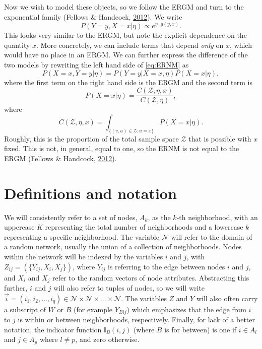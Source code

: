 \documentclass[12pt,twoside]{reedthesis}
\theoremstyle{definition}
\theoremstyle{definition}
\theoremstyle{remark}
\begin{document}
Now we wish to model these objects, so we follow the ERGM and turn to
the exponential family (Fellows \& Handcock,
\protect\hyperlink{ref-Fellows2012}{2012}). We write
\begin{equation}
  P(Y = y, X = x| \eta) \propto e^{\eta \cdot g(y, x)}.
  \label{eq:ERNM}
\end{equation}
This looks very similar to the ERGM, but note the explicit dependence on
the quantity \(x\). More concretely, we can include terms that depend
\emph{only} on \(x\), which would have no place in an ERGM. We can
further express the difference of the two models by rewriting the left
hand side of \ref{eq:ERNM} as
\begin{equation*}
  P(X = x, Y = y | \eta) = P(Y = y|X = x, \eta)P(X=x|\eta),
\end{equation*}
where the first term on the right hand side is the ERGM and the second
term is
\begin{equation*}
  P(X = x|\eta) = \frac{C(\mathcal{Z}, \eta, x)}{C(\mathcal{Z}, \eta)},
\end{equation*}
where
\begin{equation*}
  C(\mathcal{Z}, \eta, x) = \int_{\{(v, u) \in \mathcal{Z} : u = x\}} P(X = x | \eta).
\end{equation*}
Roughly, this is the proportion of the total sample space
\(\mathcal{Z}\) that is possible with \(x\) fixed. This is not, in
general, equal to one, so the ERNM is not equal to the ERGM (Fellows \&
Handcock, \protect\hyperlink{ref-Fellows2012}{2012}).

\section{Definitions and notation}\label{definitions-and-notation}

We will consistently refer to a set of nodes, \(A_{k}\), as the \(k\)-th
neighborhood, with an uppercase \(K\) representing the total number of
neighborhoods and a lowercase \(k\) representing a specific
neighborhood. The variable \(\mathcal{N}\) will refer to the domain of a
random network, usually the union of a collection of neighborhoods.
Nodes within the network will be indexed by the variables \(i\) and
\(j\), with \(Z_{ij} = (\{Y_{ij}, X_i, X_j\})\), where \(Y_{ij}\) is
referring to the edge between nodes \(i\) and \(j\), and \(X_{i}\) and
\(X_j\) refer to the random vectors of node attributes. Abstracting this
further, \(i\) and \(j\) will also refer to tuples of nodes, so we will
write
\(\vec{i} = (i_1, i_2, \dots, i_q) \in \mathcal{N} \times \mathcal{N} \times \dots \times \mathcal{N}\).
The variables \(Z\) and \(Y\) will also often carry a subscript of \(W\)
or \(B\) (for example \(Y_{Bij}\)) which emphasizes that the edge from
\(i\) to \(j\) is within or between neighborhoods, respectively.
Finally, for lack of a better notation, the indicator function
\(\mathbb{I}_{B}(i,j)\) (where \(B\) is for between) is one if
\(i \in A_{l}\) and \(j \in A_{p}\) where \(l \neq p\), and zero
otherwise.
\end{document}
